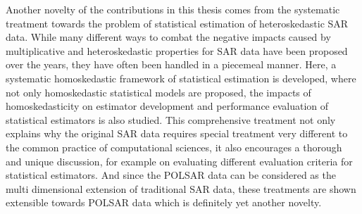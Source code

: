  Another
                novelty of the contributions in this thesis comes from the systematic
                treatment towards the problem of statistical estimation
                of heteroskedastic SAR data.
While
                many different ways to combat the negative impacts
                caused by multiplicative and heteroskedastic properties
                for SAR data have been proposed over the years, they have often been
                handled in a piecemeal manner.
Here,
                a systematic homoskedastic framework of statistical
                estimation is developed, where not only homoskedastic
                statistical models are proposed, the impacts of
                homoskedasticity on estimator development and
                performance evaluation of statistical estimators is also
                studied.
This
                comprehensive treatment not only explains why the
                original SAR data requires special treatment very
                different to the common practice of computational
                sciences, 
it
                also encourages a thorough and unique discussion, for example on
                evaluating different evaluation criteria for statistical
                estimators.  %
And
                since the POLSAR data can be considered as the multi
                dimensional extension of traditional SAR data, these
                treatments are shown extensible towards POLSAR data
                which is definitely yet another novelty. 
                
